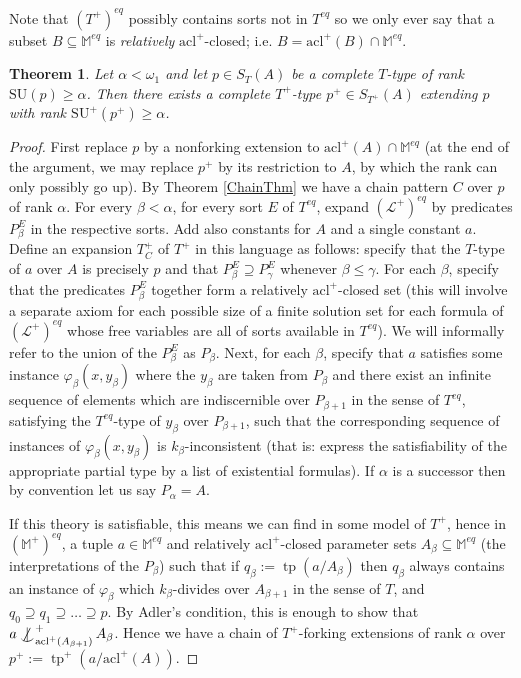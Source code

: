 \documentclass{article}
\DeclareMathOperator{\tp}{tp}
\def\notind#1#2{#1\setbox0=\hbox{$#1x$}\kern\wd0
\hbox to 0pt{\mathchardef\nn=12854\hss$#1\nn$\kern1.4\wd0\hss}
\hbox to 0pt{\hss$#1\mid$\hss}\lower.9\ht0 \hbox to 0pt{\hss$#1\smile$\hss}\kern\wd0}
\def\nind{\mathop{\mathpalette\notind{}}}
\newtheorem{theorem}{Theorem}[section]
\theoremstyle{remark}
\theoremstyle{definition}
\begin{document}
Note that $(T^+)^{eq}$ possibly contains sorts not in $T^{eq}$ so we only ever say that a subset $B\subseteq \mathbb{M}^{eq}$ is \textit{relatively} $\mathrm{acl}^+$-closed; i.e. $B=\mathrm{acl}^+(B)\cap\mathbb{M}^{eq}$.

\begin{theorem}\label{CountableThm}
    Let $\alpha<\omega_1$ and let $p\in S_T(A)$ be a complete $T$-type of rank $\mathrm{SU}(p)\geq\alpha$. Then there exists a complete $T^+$-type $p^+\in S_{T^+}(A)$ extending $p$ with rank $\mathrm{SU}^+(p^+)\geq \alpha$.
\end{theorem}
\begin{proof}
    First replace $p$ by a nonforking extension to $\mathrm{acl}^+(A)\cap \mathbb{M}^{eq}$ (at the end of the argument, we may replace $p^+$ by its restriction to $A$, by which the rank can only possibly go up). By Theorem \ref{ChainThm} we have a chain pattern $C$ over $p$ of rank $\alpha$. For every $\beta<\alpha$, for every sort $E$ of $T^{eq}$, expand $(\mathcal{L}^+)^{eq}$ by predicates $P_\beta^E$ in the respective sorts. Add also constants for $A$ and a single constant $a$. Define an expansion $T^+_C$ of $T^+$ in this language as follows: specify that the $T$-type of $a$ over $A$ is precisely $p$ and that $P_\beta^E\supseteq P_\gamma^E$ whenever $\beta\leq\gamma$. For each $\beta$, specify that the predicates $P^E_\beta$ together form a relatively $\mathrm{acl}^+$-closed set (this will involve a separate axiom for each possible size of a finite solution set for each formula of $(\mathcal{L}^+)^{eq}$ whose free variables are all of sorts available in $T^{eq}$). We will informally refer to the union of the $P_\beta^E$ as $P_\beta$. Next, for each $\beta$, specify that $a$ satisfies some instance $\varphi_\beta(x,y_\beta)$ where the $y_\beta$ are taken from $P_\beta$ and there exist an infinite sequence of elements which are indiscernible over $P_{\beta+1}$ in the sense of $T^{eq}$, satisfying the $T^{eq}$-type of $y_\beta$ over $P_{\beta+1}$, such that the corresponding sequence of instances of $\varphi_\beta(x,y_\beta)$ is $k_\beta$-inconsistent (that is: express the satisfiability of the appropriate partial type by a list of existential formulas). If $\alpha$ is a successor then by convention let us say $P_\alpha=A$.

    If this theory is satisfiable, this means we can find in some model of $T^+$, hence in $(\mathbb{M}^+)^{eq}$, a tuple $a\in\mathbb{M}^{eq}$ and relatively $\mathrm{acl}^+$-closed parameter sets $A_\beta\subseteq \mathbb{M}^{eq}$ (the interpretations of the $P_\beta$) such that if $q_\beta:=\tp(a/A_\beta)$ then $q_\beta$ always contains an instance of $\varphi_\beta$ which $k_\beta$-divides over $A_{\beta+1}$ in the sense of $T$, and $q_0\supseteq q_1\supseteq\dots \supseteq p$. By Adler's condition, this is enough to show that $a\nind^+_{\mathrm{acl}^+(A_{\beta+1})} A_\beta$. %
    Hence we have a chain of $T^+$-forking extensions of rank $\alpha$ over $p^+:=\tp^+(a/\mathrm{acl}^+(A))$.


\end{proof}
\end{document}
